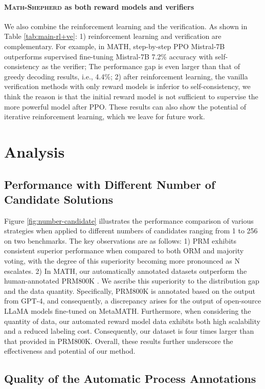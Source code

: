 \paragraph{\textsc{Math-Shepherd} as both reward models and verifiers} We also combine the reinforcement learning and the verification. As shown in Table \ref{tab:main-rl+ve}:
1) reinforcement learning and verification are complementary. For example, in MATH, step-by-step PPO Mistral-7B outperforms supervised fine-tuning Mistral-7B 7.2\% accuracy with self-consistency as the verifier; The performance gap is even larger than that of greedy decoding results, i.e., 4.4\%;
2) after reinforcement learning, the vanilla verification methods with only reward models is inferior to self-consistency, we think the reason is that the initial reward model is not sufficient to supervise the more powerful model after PPO. These results can also show the potential of iterative reinforcement learning, which we leave for future work.

\section{Analysis}

\subsection{Performance with Different Number of Candidate Solutions} Figure \ref{fig:number-candidate} illustrates the performance comparison of various strategies when applied to different numbers of candidates ranging from 1 to 256 on two benchmarks. The key observations are as follows: 1) PRM exhibits consistent superior performance when compared to both ORM and majority voting, with the degree of this superiority becoming more pronounced as N escalates. 2) In MATH, our automatically annotated datasets outperform the human-annotated PRM800K \citep{lightman2023let}. We ascribe this superiority to the distribution gap and the data quantity. Specifically, PRM800K is annotated based on the output from GPT-4, and consequently, a discrepancy arises for the output of open-source LLaMA models fine-tuned on MetaMATH. Furthermore, when considering the quantity of data, our automated reward model data exhibits both high scalability and a reduced labeling cost. Consequently, our dataset is four times larger than that provided in PRM800K. Overall, these results further underscore the effectiveness and potential of our method.

\subsection{Quality of the Automatic Process Annotations}

